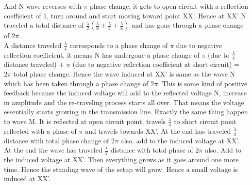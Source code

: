   And N wave reverses with $\pi$ phase change, it gets to open circuit with a reflection coefficient of  1, turn around and start moving  toward point XX'. Hence at XX' N traveled  a total distance of $ \frac{\lambda}{2} (\frac{\lambda}{8} + \frac{\lambda}{4} + \frac{\lambda}{8})$
  and has  gone through a phase change of $2\pi$.\\
  A distance traveled $\frac{\lambda}{4}$ corresponds to a phase change  of $\pi$ due to negative reflection coefficient, it means N has undergone a phase change of $\pi$  (due to $\frac{\lambda }{4}$ distance  traveled) + $\pi$ (due to negative  reflection  coefficient  at short circuit) = $2\pi$ total phase change.
  Hence  the  wave induced at XX' is same as the  wave N which has been taken through  a phase change  of $2\pi$. This is some kind of positive feedback because  the induced  voltage  will add to the  reflected  voltage N, increase in amplitude  and the re-traveling process  starts all over. That means  the voltage essentially  starts growing  in  the transmission line. Exactly the same  thing  happen to  wave M. It is reflected  at open circuit point, travels $\frac{\lambda
  }{4}$ to short circuit  point  reflected with a phase of $\pi$  and travels  towards XX'. At the end has traveled $\frac{\lambda
  }{2}$  distance  with total phase change of $2\pi$ also. add to the induced  voltage  at XX'. At the end the wave has traveled $\frac{\lambda}{2}$
  distance with total phase of $2\pi$
  also. Add to the induced voltage at XX'. Then everything  grows as it goes around one more time.  Hence the standing wave of the setup will grow.  Hence a small  voltage is induced at XX'. \\
  
